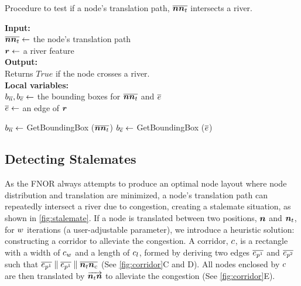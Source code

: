 \begin{algorithm}[tb!]
    \caption{Procedure to test if a node's translation path, $ \protect\overline{\bm{n}\bm{n}_t} $ intersects a river.}\label{alg:check river intersection}
    \textbf{Input:} \\
    $ \protect\overline{\bm{n}\bm{n}_t} \gets $ the node's translation path \\
    $ \bm{r} \gets $ a river feature \\

    \textbf{Output:} \\
    Returns $ True $ if the node crosses a river. \\

    \textbf{Local variables:} \\
    $ b_{\protect\overline{n}}, b_{\protect\overline{e}} \gets $ the bounding boxes for $ \protect\overline{\bm{n}\bm{n}_t} $ and $ \protect\overline{e} $ \\
    $ \protect\overline{e} \gets $ an edge of $ \bm{r} $ \\

    \begin{algorithmic}[1]
        
        \ForEach{$ \Edge \in \river $}
            \State $ b_{\protect\overline{n}} \gets $ GetBoundingBox ($ \protect\overline{\bm{n}\bm{n}_t} $)
            \State $ b_{\protect\overline{e}} \gets $ GetBoundingBox ($ \protect\overline{e} $)

                \State {}
                \EndIf
        \EndFor
        
        \State {}
        \EndProcedure
    \end{algorithmic}
\end{algorithm}

\subsection{Detecting Stalemates}

As the FNOR always attempts to produce an optimal node layout where node distribution and translation are minimized, a node's translation path can repeatedly intersect a river due to congestion, creating a stalemate situation, as shown in \autoref{fig:stalemate}. If a node is translated between two positions, $ \bm{n} $ and $ \bm{n}_t $, for $ w $ iterations (a user-adjustable parameter), we introduce a heuristic solution: constructing a corridor to alleviate the congestion. A corridor, $ c $, is a rectangle with a width of $ c_w $ and a length of $ c_l $, formed by deriving two edges $ \protect\overline{e_{p^1}} $ and $ \protect\overline{e_{p^2}} $ such that $ \protect\overline{e_{p^1}} \parallel \protect\overline{e_{p^1}} \parallel \protect\overline{\bm{n}_t\bm{n}_c} $ (See \autoref{fig:corridor}C and D). All nodes enclosed by $ c $ are then translated by $ \protect\overrightarrow{\bm{n}_t\bm{n}} $ to alleviate the congestion (See \autoref{fig:corridor}E).


